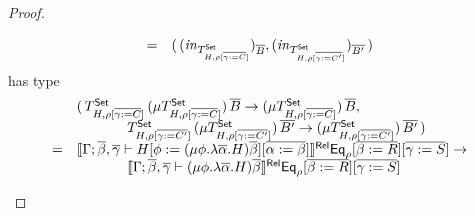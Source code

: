 \documentclass[acmsmall,review,anonymous]{acmart}
\theoremstyle{definition}
\newcommand{\set}{\mathsf{Set}}
\begin{document}
\begin{proof}
\begin{itemize}
\[\begin{array}{ll}
=& (\, (\mathit{in}_{T^\set_{H,\rho[\ol{\gamma := C}]}})_{\ol{B}},
(\mathit{in}_{T^\set_{H,\rho[\ol{\gamma := C'}]}})_{\ol{B'}}\,)
\end{array}\]
has type
\[\begin{array}{ll}
& (\, T^\set_{H,\rho[\ol{\gamma := C}]}\, (\mu
T^\set_{H,\rho[\ol{\gamma := C}]}) \, 
\ol{B} \to (\mu T^\set_{H,\rho[\ol{\gamma := C}]}) \, \ol{B}, \, \\
& \hspace*{0.5in}T^\set_{H,\rho[\ol{\gamma := C'}]}\, (\mu
T^\set_{H,\rho[\ol{\gamma := C'}]}) \, 
\ol{B'} \to (\mu T^\set_{H,\rho[\ol{\gamma := C'}]}) \,\ol{B'} \, )\\
= &
 \relsem{\Gamma;\ol{\beta},\ol{\gamma} \vdash H[\phi := (\mu
    \phi.\lambda {\overline \alpha}.H){\overline \beta}][\ol{\alpha :=
      \beta}]}\Eq_\rho[\ol{\beta := R}][\ol{\gamma := S}] \to\\
 & \hspace*{0.5in} \relsem{\Gamma;\ol{\beta},\ol{\gamma} \vdash (\mu
  \phi.\lambda \ol{\alpha}.H)\ol{\beta}} \Eq_\rho[\ol{\beta:=
    R}][\ol{\gamma :=S}]
\end{array}\]




\end{itemize}
\end{proof}
\end{document}
